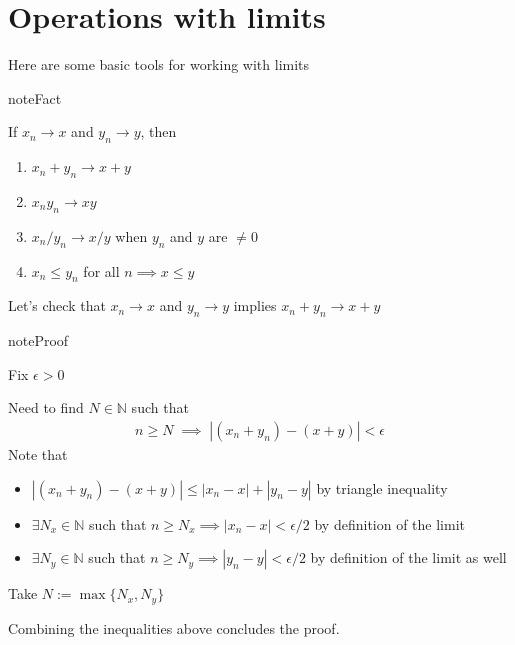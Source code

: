 \documentclass[letterpaper,10pt,english]{jupyterBook}
\begin{document}
\section{Operations with limits}
\label{\detokenize{04.basic_analysis:operations-with-limits}}
\sphinxAtStartPar
Here are some basic tools for working with limits

\begin{sphinxadmonition}{note}{Fact}

\sphinxAtStartPar
If \(x_n \to x\) and  \(y_n \to y\), then
\begin{enumerate}
%
\item {} 
\sphinxAtStartPar
\(x_n + y_n \to x +  y\)

\item {} 
\sphinxAtStartPar
\(x_n y_n \to x y\)

\item {} 
\sphinxAtStartPar
\(x_n /y_n \to x / y\) when \(y_n\) and \(y\) are \(\ne 0\)

\item {} 
\sphinxAtStartPar
\(x_n \leq y_n\) for all \(n \implies x \leq y\)

\end{enumerate}
\end{sphinxadmonition}

\sphinxAtStartPar
Let’s check that \(x_n \to x\) and \(y_n \to y\) implies \(x_n + y_n \to x +  y\)

\begin{sphinxadmonition}{note}{Proof}

\sphinxAtStartPar
Fix \(\epsilon > 0\)

\sphinxAtStartPar
Need to find \(N \in \mathbb{N}\) such that
\begin{equation*}
\begin{split}
n \geq N 
\; \implies \;
|(x_n + y_n) - (x + y)| < \epsilon
\end{split}
\end{equation*}
\sphinxAtStartPar
Note that
\begin{itemize}
\item {} 
\sphinxAtStartPar
\(|(x_n + y_n) - (x + y)| \leq |x_n - x| + |y_n - y|\) by triangle inequality

\item {} 
\sphinxAtStartPar
\(\exists N_x \in \mathbb{N}\) such that \(n \geq N_x \implies |x_n - x| < \epsilon/2\) by definition of the limit

\item {} 
\sphinxAtStartPar
\(\exists N_y \in \mathbb{N}\) such that \(n \geq N_y \implies |y_n - y| < \epsilon/2\) by definition of the limit as well

\end{itemize}

\sphinxAtStartPar
Take \(N := \max\{N_x, N_y\}\)

\sphinxAtStartPar
Combining the inequalities above concludes the proof.
\end{sphinxadmonition}
\end{document}

